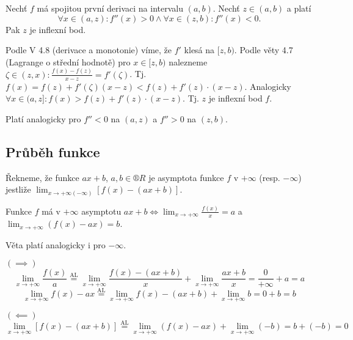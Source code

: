 \documentclass[12pt]{article}					%
\begin{document}

        \begin{veta}
            Nechť $f$ má spojitou první derivaci na intervalu $(a, b)$. Nechť $z \in (a, b)$ a platí
            $$ \forall x \in (a, z): f''(x)>0 \land \forall x \in (z, b): f''(x)<0. $$ 
            Pak $z$ je inflexní bod.

            \begin{dukazin}
                Podle V 4.8 (derivace a monotonie) víme, že $f'$ klesá na $[z, b)$. Podle věty 4.7 (Lagrange o střední hodnotě) pro $x \in [z, b)$ nalezneme $\zeta \in (z, x): \frac{f(x) - f(z)}{x - z} = f'(\zeta)$. Tj. $f(x) = f(z) + f'(\zeta)(x-z) < f(z) + f'(z)·(x-z)$. Analogicky $\forall x \in (a, z]: f(x) > f(z) + f'(z)·(x-z)$. Tj. $z$ je inflexní bod $f$.
            \end{dukazin}

            \begin{poznamkain}
                Platí analogicky pro  $f'' < 0$ na $(a, z)$ a $f'' > 0$ na $(z, b)$.
            \end{poznamkain}
        \end{veta}

    \subsection{Průběh funkce}

        \begin{definice}
            Řekneme, že funkce $ax + b$, $a, b \in ®R$ je asymptota funkce $f$ v $+∞$ (resp. $-∞$) jestliže $\lim_{x \rightarrow +∞ (-∞)} [f(x) - (ax+b)]$.
        \end{definice}

        \begin{veta}
            Funkce $f$ má v $+∞$ asymptotu $ax + b \Leftrightarrow \lim_{x \rightarrow +∞} \frac{f(x)}{x} = a$ a $\lim_{x \rightarrow +∞} (f(x) - ax) = b$.

            \begin{poznamkain}
                Věta platí analogicky i pro $-∞$.
            \end{poznamkain}

            \begin{dukazin}
                $(\implies)$
                $$ \lim_{x \rightarrow +∞} \frac{f(x)}{a} \overset{\text{AL}}{=} \lim_{x \rightarrow +∞} \frac{f(x) - (ax + b)}{x} + \lim_{x \rightarrow +∞} \frac{ax + b}{x} = \frac{0}{+∞} + a = a $$
                $$ \lim_{x \rightarrow +∞} f(x) - ax \overset{\text{AL}}{=} \lim_{x \rightarrow +∞} f(x) - (ax + b) + \lim_{x \rightarrow +∞} b = 0 + b = b $$

                $(\impliedby)$
                $$ \lim_{x \rightarrow +∞} [f(x) - (ax + b)] \overset{\text{AL}}{=} \lim_{x \rightarrow +∞} (f(x) - ax) + \lim_{x \rightarrow +∞} (-b) = b + (-b) = 0 $$ 
            \end{dukazin}
        \end{veta}
\end{document}
